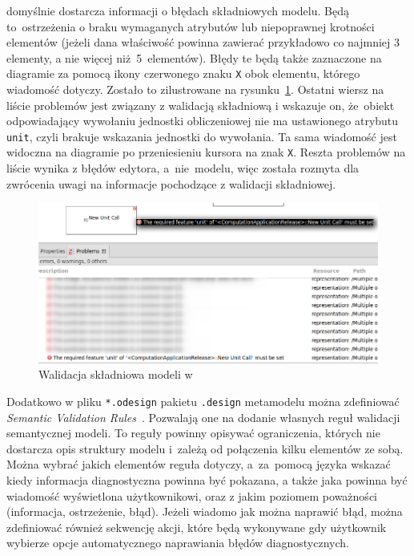 \SiriusDesktop{} domyślnie dostarcza informacji o błędach składniowych
modelu. Będą to~ostrzeżenia o braku wymaganych atrybutów lub niepoprawnej
krotności elementów (jeżeli dana właściwość powinna zawierać przykładowo co
najmniej 3 elementy, a nie więcej niż~5~elementów). Błędy te będą także
zaznaczone na diagramie za pomocą ikony czerwonego znaku \texttt{X} obok
elementu, którego wiadomość dotyczy. Zostało to zilustrowane na
rysunku~\ref{rys:sirius-desktop-syntax-validation}.
Ostatni wiersz na liście problemów jest związany z walidacją składniową i
wskazuje on, że~obiekt odpowiadający wywołaniu jednostki obliczeniowej nie ma
ustawionego atrybutu \texttt{unit}, czyli brakuje wskazania jednostki do
wywołania. Ta sama wiadomość jest widoczna na diagramie po przeniesieniu
kursora na znak \texttt{X}.
Reszta problemów na liście wynika z błędów edytora, a~nie~modelu, więc została
rozmyta dla zwrócenia uwagi na informacje pochodzące z walidacji składniowej.

\begin{figure}[!hb]
	\centering

	\includegraphics[width=0.95\linewidth]{./images/sirius-desktop-syntax-validation.png}
	\caption{Walidacja składniowa modeli w \SiriusDesktop{}}\label{rys:sirius-desktop-syntax-validation}
\end{figure}

Dodatkowo w pliku \texttt{*.odesign} pakietu \texttt{.design} metamodelu można
zdefiniować \emph{Semantic Validation
	Rules}~\cite{sirius-desktop-documentation-validation-rules}.
Pozwalają one na dodanie własnych reguł walidacji semantycznej modeli. To
reguły powinny opisywać ograniczenia, których nie dostarcza opis struktury
modelu i~zależą od połączenia kilku elementów ze sobą. Można
wybrać jakich elementów reguła dotyczy, a~za~pomocą języka \AQL{} wskazać
kiedy informacja diagnostyczna powinna być pokazana, a także jaka powinna być
wiadomość wyświetlona użytkownikowi, oraz z jakim poziomem poważności
(informacja, ostrzeżenie, błąd). Jeżeli wiadomo jak można naprawić błąd, można
zdefiniować również sekwencję akcji, które będą wykonywane gdy użytkownik
wybierze
opcje automatycznego naprawiania błędów diagnostycznych.

